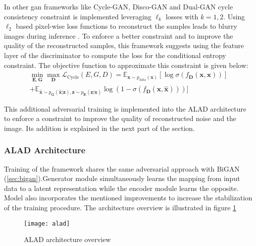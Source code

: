 In other gan frameworks like Cycle-GAN\cite{Zhu2017UnpairedIT}, Disco-GAN \cite{Kim2017LearningTD}
and Dual-GAN \cite{Yi2017DualGANUD} cycle consistency constraint is implemented leveraging
$\ell_{k}$ losses with $k=1,2$. Using $\ell_2$ based pixel-wise loss functions to reconstruct the samples
leads to blurry images during inference \cite{Larsen2016AutoencodingBP}\cite{Li2017TowardsUA}.
To enforce a better constraint and to improve the quality of the reconstructed samples, this
framework suggests using the feature layer of the discriminator to compute the loss for the
conditional entropy constraint. The objective function to approximate this constraint is given
below:
\begin{multline}
    \label{eqn:alice}
     \min _{\boldsymbol{E}, \boldsymbol{G}} \max _{\boldsymbol{D}}
\mathcal{L}_{\mathrm{Cycle}}(E,G,D)
=\mathbb{E}_{\boldsymbol{x} \sim p_{\text{data}}(\boldsymbol{x})}\left[\log
\sigma\left(f_{\boldsymbol{D}}(\boldsymbol{x}, \boldsymbol{x})\right)\right] \\
+\mathbb{E}_{\hat{\boldsymbol{x}} \sim p_{\boldsymbol{G}}(\hat{\boldsymbol{x}} | \boldsymbol{z}),
\boldsymbol{z} \sim p_{\boldsymbol{E}}(\boldsymbol{z} | \boldsymbol{x})} \log
\left(1-\sigma\left(f_{\boldsymbol{D}}(\boldsymbol{x}, \hat{\boldsymbol{x}})\right)\right) ] 
\end{multline}

This additional adversarial training is implemented into the ALAD architecture to enforce a
constraint to improve the quality of reconstructed noise and the image. Its addition is explained in
the next part of the section. 

\subsubsection{ALAD Architecture}
\label{sec:alad_arc}

Training of the framework shares the same adversarial approach with BiGAN
(\ref{sec:bigan}).Generator module simultaneously learns the mapping from input data to a latent
representation while the encoder module learns the opposite. Model also incorporates the mentioned
improvements to increase the stabilization of the training procedure.  The architecture overview is
illustrated in figure \ref{fig:alad_model}

\begin{figure}[h!]
	\centering
	\texttt{[image: alad]}
    \caption{ALAD architecture overview}
    \label{fig:alad_model}
\end{figure}

